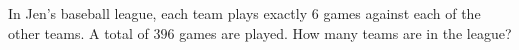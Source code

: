 In Jen's baseball league, each team plays exactly $6$ games against each of the other teams. A total of $396$ games are played. How many teams are in the league?
